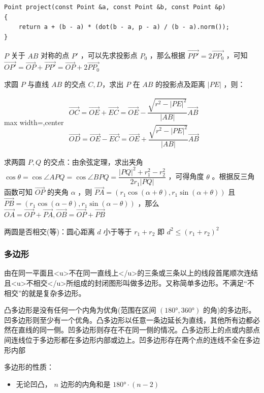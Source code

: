 \documentclass[twocolumn,10pt]{ctexart}
\newcommand{\ang}{\angle}
\begin{document}
\begin{verbatim}
Point project(const Point &a, const Point &b, const Point &p)
{
    return a + (b - a) * (dot(b - a, p - a) / (b - a).norm());
}
\end{verbatim}

$P$ 关于 $AB$ 对称的点 $P'$ ，可以先求投影点 $P_0$ ，那么根据 $\vec{PP'}=2\vec{PP_0}$ ，可知 $\vec{OP'}=\vec{OP}+\vec{PP'}=\vec{OP}+2\vec{PP_0}$

求圆 $P$ 与直线 $AB$ 的交点 $C,D$，求出 $P$ 在 $AB$ 的投影点及距离 $|PE|$ ，则：

\begin{adjustbox}{max width=\linewidth,center}
$\begin{gathered}
\vec{OC}=\vec{OE}+\vec{EC}=\vec{OE}-\dfrac{\sqrt{r^2-|PE|^2}}{|AB|}\vec{AB}
\\
\vec{OD}=\vec{OE}-\vec{EC}=\vec{OE}+\dfrac{\sqrt{r^2-|PE|^2}}{|AB|}\vec{AB}
\end{gathered}$
\end{adjustbox}

求两圆 $P,Q$ 的交点：由余弦定理，求出夹角 $\cos\theta=\cos\ang APQ=\cos\ang BPQ=\dfrac{|PQ|^2+r_1^2-r_2^2}{2r_1|PQ|}$ ，可得角度 $\theta$ 。根据反三角函数可知 $\vec{OP}$ 的夹角 $\alpha$ ，则 $\vec{PA}=(r_1\cos(\alpha+\theta),\allowbreak{}r_1\sin(\alpha+\theta))$ 且 $\vec{PB}=(r_1\cos(\alpha-\theta),\allowbreak{}r_1\sin(\alpha-\theta))$ ，那么 $\vec{OA}=\vec{OP}+\vec{PA},\allowbreak{}\vec{OB}=\vec{OP}+\vec{PB}$

两圆是否相交(等)：圆心距离 $d$ 小于等于 $r_1+r_2$ 即 $d^2\le(r_1+r_2)^2$

\subsubsection{多边形}

由在同一平面且<u>不在同一直线上</u>的三条或三条以上的线段首尾顺次连结且<u>不相交</u>所组成的封闭图形叫做多边形。又称简单多边形。不满足“不相交”的就是复杂多边形。

凸多边形是没有任何一个内角为优角(范围在区间 $(180°,360°)$ 的角)的多边形。凹多边形则至少有一个优角。凸多边形以任意一条边延长为直线，其他所有边都必然在直线的同一侧。凹多边形则存在不在同一侧的情况。凸多边形上的点或内部点间连线位于多边形都在多边形内部或边上。凹多边形存在两个点的连线不全在多边形内部

多边形的性质：

\begin{itemize}
\item 无论凹凸， $n$ 边形的内角和是 $180°\cdot (n-2)$
\end{itemize}
\end{document}
